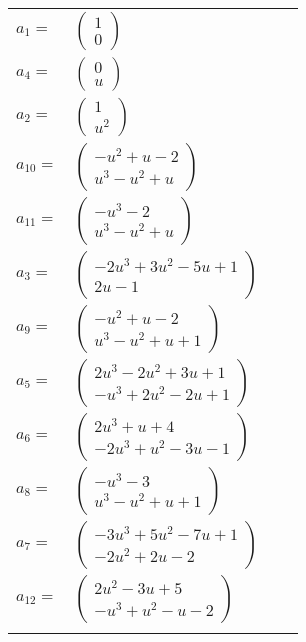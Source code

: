 \documentclass[1p]{elsarticle_modified}
\theoremstyle{definition}
\begin{document}
\begin{tabular}{m{7pt} m{180pt} m{7pt} m{180pt} }
\flushright $a_{1}=$&$\begin{pmatrix}1\\0\end{pmatrix}$ \\
\flushright $a_{4}=$&$\begin{pmatrix}0\\u\end{pmatrix}$ \\
\flushright $a_{2}=$&$\begin{pmatrix}1\\u^2\end{pmatrix}$ \\
\flushright $a_{10}=$&$\begin{pmatrix}- u^2+u-2\\u^3- u^2+u\end{pmatrix}$ \\
\flushright $a_{11}=$&$\begin{pmatrix}- u^3-2\\u^3- u^2+u\end{pmatrix}$ \\
\flushright $a_{3}=$&$\begin{pmatrix}-2 u^3+3 u^2-5 u+1\\2 u-1\end{pmatrix}$ \\
\flushright $a_{9}=$&$\begin{pmatrix}- u^2+u-2\\u^3- u^2+u+1\end{pmatrix}$ \\
\flushright $a_{5}=$&$\begin{pmatrix}2 u^3-2 u^2+3 u+1\\- u^3+2 u^2-2 u+1\end{pmatrix}$ \\
\flushright $a_{6}=$&$\begin{pmatrix}2 u^3+u+4\\-2 u^3+u^2-3 u-1\end{pmatrix}$ \\
\flushright $a_{8}=$&$\begin{pmatrix}- u^3-3\\u^3- u^2+u+1\end{pmatrix}$ \\
\flushright $a_{7}=$&$\begin{pmatrix}-3 u^3+5 u^2-7 u+1\\-2 u^2+2 u-2\end{pmatrix}$ \\
\flushright $a_{12}=$&$\begin{pmatrix}2 u^2-3 u+5\\- u^3+u^2- u-2\end{pmatrix}$\\&\end{tabular}
\end{document}
